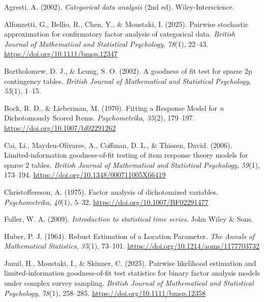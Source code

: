 \documentclass[
  letterpaper,
  DIV=11,
  numbers=noendperiod]{scrartcl}
\newlength{\cslhangindent}
\newenvironment{CSLReferences}[2] %
 {\begin{list}{}{%
  \setlength{\itemindent}{0pt}
  \setlength{\leftmargin}{0pt}
  \setlength{\parsep}{0pt}
  \ifodd #1
   \setlength{\leftmargin}{\cslhangindent}
   \setlength{\itemindent}{-1\cslhangindent}
  \fi
  \setlength{\itemsep}{#2\baselineskip}}}
 {\end{list}}
\begin{document}
\label{refs}
\begin{CSLReferences}{1}{0}
Agresti, A. (2002). \emph{Categorical data analysis} (2nd ed).
Wiley-Interscience.

Alfonzetti, G., Bellio, R., Chen, Y., \& Moustaki, I. (2025). Pairwise
stochastic approximation for confirmatory factor analysis of categorical
data. \emph{British Journal of Mathematical and Statistical Psychology},
\emph{78}(1), 22--43. \url{https://doi.org/10.1111/bmsp.12347}

Bartholomew, D. J., \& Leung, S. O. (2002). A goodness of fit test for
sparse 2p contingency tables. \emph{British Journal of Mathematical and
Statistical Psychology}, \emph{55}(1), 1--15.

Bock, R. D., \& Lieberman, M. (1970). Fitting a {Response Model} for
{\emph{n}} {Dichotomously Scored Items}. \emph{Psychometrika},
\emph{35}(2), 179--197. \url{https://doi.org/10.1007/bf02291262}

Cai, Li., Maydeu-Olivares, A., Coffman, D. L., \& Thissen, David.
(2006). Limited-information goodness-of-fit testing of item response
theory models for sparse 2 tables. \emph{British Journal of Mathematical
and Statistical Psychology}, \emph{59}(1), 173--194.
\url{https://doi.org/10.1348/000711005X66419}

Christoffersson, A. (1975). Factor analysis of dichotomized variables.
\emph{Psychometrika}, \emph{40}(1), 5--32.
\url{https://doi.org/10.1007/BF02291477}

Fuller, W. A. (2009). \emph{Introduction to statistical time series}.
John Wiley \& Sons.

Huber, P. J. (1964). Robust {Estimation} of a {Location Parameter}.
\emph{The Annals of Mathematical Statistics}, \emph{35}(1), 73--101.
\url{https://doi.org/10.1214/aoms/1177703732}

Jamil, H., Moustaki, I., \& Skinner, C. (2025). Pairwise likelihood
estimation and limited-information goodness-of-fit test statistics for
binary factor analysis models under complex survey sampling.
\emph{British Journal of Mathematical and Statistical Psychology},
\emph{78}(1), 258--285. \url{https://doi.org/10.1111/bmsp.12358}


\end{CSLReferences}
\end{document}
